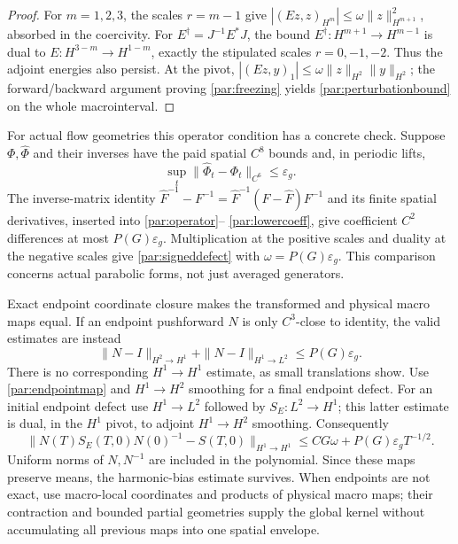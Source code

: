 \documentclass[11pt,a4paper]{amsart}
\theoremstyle{definition}
\theoremstyle{remark}
\numberwithin{equation}{section}
\begin{document}
\begin{proof}
For $m=1,2,3$, the scales $r=m-1$ give
$|(Ez,z)_{H^m}|\le\omega\|z\|_{H^{m+1}}^2$, absorbed in the coercivity.
For $E^\dagger=J^{-1}E^*J$, the bound
$E^\dagger:H^{m+1}\to H^{m-1}$ is dual to
$E:H^{3-m}\to H^{1-m}$, exactly the stipulated scales $r=0,-1,-2$.
Thus the adjoint energies also persist. At the pivot,
$|(Ez,y)_1|\le\omega\|z\|_{H^2}\|y\|_{H^2}$; the forward/backward
argument proving \eqref{par:freezing} yields
\eqref{par:perturbationbound} on the whole macrointerval.
\end{proof}

For actual flow geometries this operator condition has a concrete check.
Suppose $\Phi,\widehat\Phi$ and their inverses have the paid spatial $C^8$
bounds and, in periodic lifts,
\begin{equation}\label{par:mapdefect}
 \sup_t\|\widehat\Phi_t-\Phi_t\|_{C^6}\le\varepsilon_g.
\end{equation}
The inverse-matrix identity
$\widehat F^{-1}-F^{-1}=\widehat F^{-1}(F-\widehat F)F^{-1}$ and its
finite spatial derivatives, inserted into \eqref{par:operator}--
\eqref{par:lowercoeff}, give coefficient $C^2$ differences at most
$P(G)\varepsilon_g$. Multiplication at the positive scales and duality at
the negative scales give \eqref{par:signeddefect} with
$\omega=P(G)\varepsilon_g$. This comparison concerns actual parabolic
forms, not just averaged generators.

Exact endpoint coordinate closure makes the transformed and physical macro
maps equal. If an endpoint pushforward $N$ is only $C^3$-close to identity,
the valid estimates are instead
\begin{equation}\label{par:endpointmap}
 \|N-I\|_{H^2\to H^1}+\|N-I\|_{H^1\to L^2}
 \le P(G)\varepsilon_g.
\end{equation}
There is no corresponding $H^1\to H^1$ estimate, as small translations show.
Use \eqref{par:endpointmap} and $H^1\to H^2$ smoothing for a final endpoint
defect. For an initial endpoint defect use $H^1\to L^2$ followed by
$S_E:L^2\to H^1$; this latter estimate is dual, in the $H^1$ pivot, to
adjoint $H^1\to H^2$ smoothing. Consequently
\begin{equation}\label{par:endpointpaid}
 \|N(T)S_E(T,0)N(0)^{-1}-S(T,0)\|_{H^1\to H^1}
 \le CG\omega+P(G)\varepsilon_gT^{-1/2}.
\end{equation}
Uniform norms of $N,N^{-1}$ are included in the polynomial. Since these
maps preserve means, the harmonic-bias estimate survives. When endpoints
are not exact, use macro-local coordinates and products of physical macro
maps; their contraction and bounded partial geometries supply the global
kernel without accumulating all previous maps into one spatial envelope.
\end{document}
